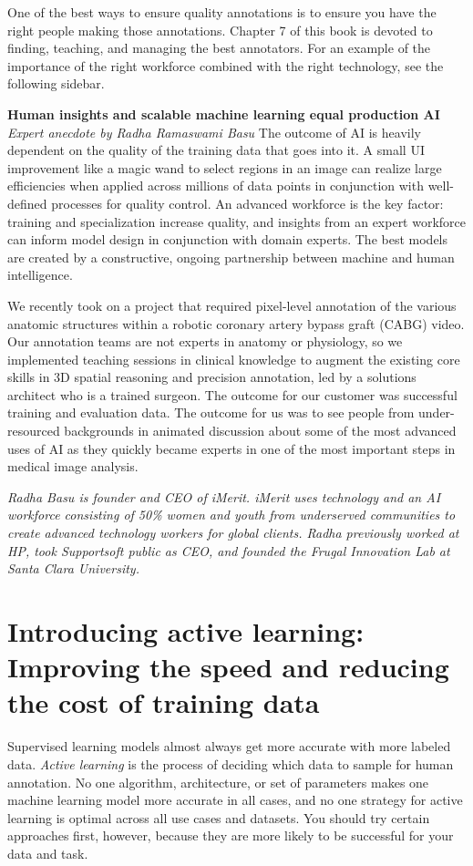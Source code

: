 \documentclass[sigconf,nonacm,screen,pbalance]{acmart}
\begin{document}
One of the best ways to ensure quality annotations is to ensure you have the right people making those annotations. Chapter 7 of this book is devoted to finding, teaching, and managing the best annotators. For an example of the importance of the right workforce combined with the right technology, see the following sidebar.

\textbf{Human insights and scalable machine learning equal production AI}
\emph{Expert anecdote by Radha Ramaswami Basu}
The outcome of AI is heavily dependent on the quality of the training data that goes into it. A small UI improvement like a magic wand to select regions in an image can realize large efficiencies when applied across millions of data points in conjunction with well-defined processes for quality control. An advanced workforce is the key factor: training and specialization increase quality, and insights from an expert workforce can inform model design in conjunction with domain experts. The best models are created by a constructive, ongoing partnership between machine and human intelligence.

We recently took on a project that required pixel-level annotation of the various anatomic structures within a robotic coronary artery bypass graft (CABG) video. Our annotation teams are not experts in anatomy or physiology, so we implemented teaching sessions in clinical knowledge to augment the existing core skills in 3D spatial reasoning and precision annotation, led by a solutions architect who is a trained surgeon. The outcome for our customer was successful training and evaluation data. The outcome for us was to see people from under-resourced backgrounds in animated discussion about some of the most advanced uses of AI as they quickly became experts in one of the most important steps in medical image analysis.

\emph{Radha Basu is founder and CEO of iMerit. iMerit uses technology and an AI workforce consisting of 50\% women and youth from underserved communities to create advanced technology workers for global clients. Radha previously worked at HP, took Supportsoft public as CEO, and founded the Frugal Innovation Lab at Santa Clara University.}

\section{Introducing active learning: Improving the speed and reducing the cost of training data}
Supervised learning models almost always get more accurate with more labeled data. \emph{Active learning} is the process of deciding which data to sample for human annotation. No one algorithm, architecture, or set of parameters makes one machine learning model more accurate in all cases, and no one strategy for active learning is optimal across all use cases and datasets. You should try certain approaches first, however, because they are more likely to be successful for your data and task.
\end{document}
